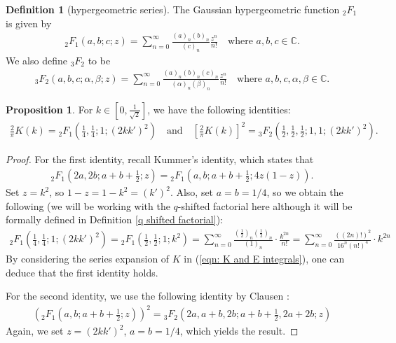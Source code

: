 \documentclass[11pt]{amsart}
\theoremstyle{definition}
\numberwithin{theorem}{section}
\newtheorem{definition}[theorem]{Definition}
\newtheorem{proposition}[theorem]{Proposition}
\begin{document}
\begin{definition}[hypergeometric series]
    The Gaussian hypergeometric function $_{2}F_1$ is given by \begin{align*}
        _2F_1\left(a,b;c;z\right)=\sum_{n=0}^{\infty}\frac{\left(a\right)_n\left(b\right)_n}{\left(c\right)_n} \frac{z^n}{n!}\quad\text{where }a,b,c \in\mathbb{C}.
    \end{align*}
    We also define $_3F_2$ to be 
    \begin{align*}
        _3F_2\left(a,b,c; \alpha, \beta ;z\right)=\sum_{n=0}^{\infty}\frac{\left(a\right)_n\left(b\right)_n \left(c\right)_n}{\left(\alpha \right)_n\left(\beta \right)_n}\frac{z^n}{n!}\quad\text{where }a,b,c,\alpha,\beta \in\mathbb{C}.
    \end{align*}
\end{definition}
\begin{proposition}
    For $k\in \left[0,\frac{1}{\sqrt{2}}\right]$, we have the following identities: \begin{align*}
        \frac{2}{\pi}K\left(k\right)={_2F_1}\left(\frac{1}{4},\frac{1}{4};1;\left(2kk'\right)^2\right)\quad\text{and}\quad 
        \left[\frac{2}{\pi}K\left(k\right)\right]^2={_3F_2}\left(\frac{1}{2},\frac{1}{2},\frac{1}{2};1,1;\left(2kk'\right)^2\right).
    \end{align*}
\end{proposition}
\begin{proof}
For the first identity, recall Kummer's identity, which states that 
\begin{align*}
    {_2F_1}\left(2a,2b;a+b+\frac{1}{2};z\right)={_2F_1}\left(a,b;a+b+\frac{1}{2};4z\left(1-z\right)\right).
\end{align*}
Set $z=k^2$, so $1-z=1-k^2=\left(k'\right)^2$. Also, set $a=b=1/4$, so we obtain the following (we will be working with the $q$-shifted factorial here although it will be formally defined in Definition \ref{q shifted factorial}): \begin{align*}
{_2F_1}\left(\frac{1}{4},\frac{1}{4};1;\left(2kk'\right)^2\right)={_2F_1}\left(\frac{1}{2},\frac{1}{2};1;k^2\right)=\sum_{n=0}^{\infty}\frac{\left(\frac{1}{2}\right)_n\left(\frac{1}{2}\right)_n}{\left(1\right)_n}\cdot \frac{k^{2n}}{n!}=\sum_{n=0}^{\infty}\frac{\left(\left(2n\right)!\right)^2}{16^n\left(n!\right)^4}\cdot k^{2n}
\end{align*}
By considering the series expansion of $K$ in (\ref{eqn: K and E integrals}), one can deduce that the first identity holds.

For the second identity, we use the following identity by Clausen \cite{Jesus}: \begin{align*}
\left({_2F_1}\left(a,b;a+b+\frac{1}{2};z\right)\right)^2={_3F_2}\left(2a,a+b,2b;a+b+\frac{1}{2},2a+2b;z\right)
\end{align*}
Again, we set $z=\left(2kk'\right)^2$, $a=b=1/4$, which yields the result.
\end{proof}
\end{document}
